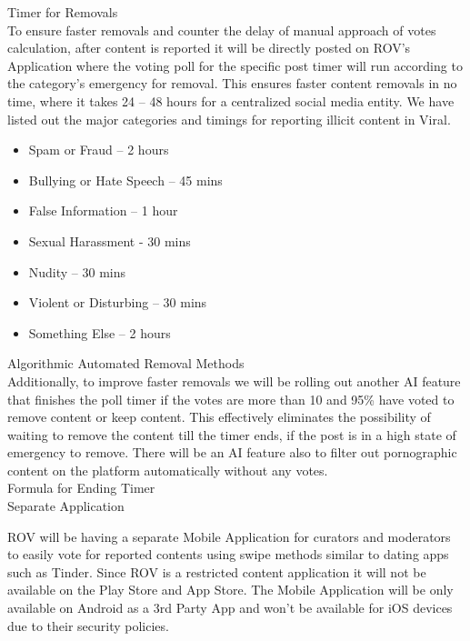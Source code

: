 \documentclass[10pt]{article}
\begin{document}
Timer for Removals\\
To ensure faster removals and counter the delay of manual approach of votes calculation, after content is reported it will be directly posted on ROV’s Application where the voting poll for the specific post timer will run according to the category’s emergency for removal. This ensures faster content removals in no time, where it takes 24 – 48 hours for a centralized social media entity. We have listed out the major categories and timings for reporting illicit content in Viral. \\

\begin{itemize}[leftmargin=+0.2in]
\item Spam or Fraud – 2 hours
\item Bullying or Hate Speech – 45 mins
\item False Information – 1 hour
\item Sexual Harassment - 30 mins
\item Nudity – 30 mins
\item Violent or Disturbing – 30 mins
\item Something Else – 2 hours
\end{itemize}

Algorithmic Automated Removal Methods\\

Additionally, to improve faster removals we will be rolling out another AI feature that finishes the poll timer if the votes are more than 10 and 95\% have voted to remove content or keep content. This effectively eliminates the possibility of waiting to remove the content till the timer ends, if the post is in a high state of emergency to remove. There will be an AI feature also to filter out pornographic content on the platform automatically without any votes.\\

Formula for Ending Timer\\

Separate Application

ROV will be having a separate Mobile Application for curators and moderators to easily vote for reported contents using swipe methods similar to dating apps such as Tinder. Since ROV is a restricted content application it will not be available on the Play Store and App Store. The Mobile Application will be only available on Android as a 3rd Party App and won’t be available for iOS devices due to their security policies.\\
\end{document}
